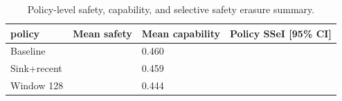 \begin{table}[t]
\centering
\begingroup
\small
\setlength{\tabcolsep}{3pt}
\renewcommand{\arraystretch}{0.94}
\begin{tabularx}{\linewidth}{@{}lXXX@{}}
\toprule
policy & Mean safety & Mean capability & Policy SSeI [95\% CI] \\
\midrule
Baseline &  & 0.460 &  \\
Sink+recent &  & 0.459 &  \\
Window 128 &  & 0.444 &  \\
\bottomrule
\end{tabularx}
\endgroup
\caption{Policy-level safety, capability, and selective safety erasure summary.}
\label{tab:main-results}
\end{table}
